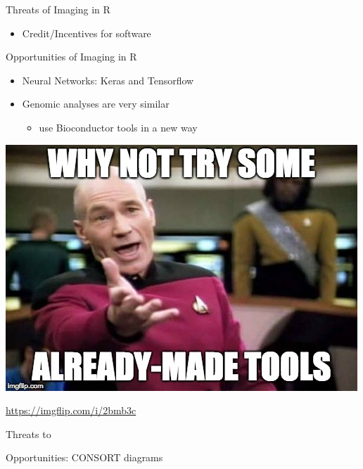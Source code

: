 \documentclass[ignorenonframetext,]{beamer}
\providecommand{\tightlist}{%
  \setlength{\itemsep}{0pt}\setlength{\parskip}{0pt}}
\begin{document}
\begin{frame}[fragile]
\begin{block}{Threats of Imaging in R}
\begin{itemize}
  \begin{itemize}
  \tightlist
  \item
    one stronghold of statisticians
  \end{itemize}
\item
  Credit/Incentives for software
\end{itemize}

\end{block}

\begin{block}{Opportunities of Imaging in R}

\hypertarget{left_col}{}
\begin{itemize}
\tightlist
\item
  Neural Networks: Keras and Tensorflow
\item
  Genomic analyses are very similar

  \begin{itemize}
  \tightlist
  \item
    use Bioconductor tools in a new way
  \end{itemize}
\end{itemize}

\hypertarget{right_col}{}
\includegraphics[width=1\linewidth]{figure/bioc_tools}

\url{https://imgflip.com/i/2bmb3c}

\end{block}

\begin{block}{Threats to}

\end{block}

\begin{block}{Opportunities: CONSORT diagrams}


\end{block}
\end{frame}
\end{document}
